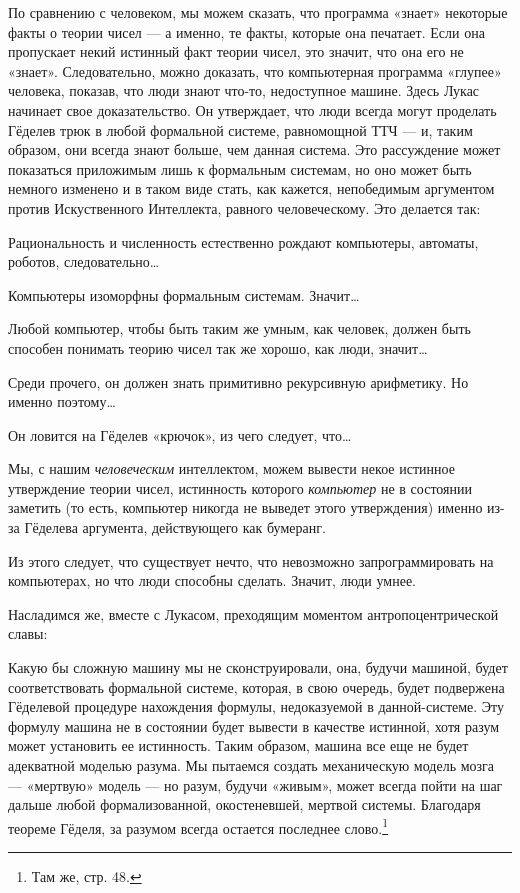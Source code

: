 По сравнению с человеком, мы можем сказать, что программа «знает» некоторые факты о теории чисел --- а именно, те факты, которые она печатает. Если она пропускает некий истинный факт теории чисел, это значит, что она его не «знает». Следовательно, можно доказать, что компьютерная программа «глупее» человека, показав, что люди знают что-то, недоступное машине. Здесь Лукас начинает свое доказательство. Он утверждает, что люди всегда могут проделать Гёделев трюк в любой формальной системе, равномощной ТТЧ --- и, таким образом, они всегда знают больше, чем данная система. Это рассуждение может показаться приложимым лишь к формальным системам, но оно может быть немного изменено и в таком виде стать, как кажется, непобедимым аргументом против Искуственного Интеллекта, равного человеческому. Это делается так:

Рациональность и численность естественно рождают компьютеры, автоматы, роботов, следовательно\ldots{}

Компьютеры изоморфны формальным системам. Значит\ldots{}

Любой компьютер, чтобы быть таким же умным, как человек, должен быть способен понимать теорию чисел так же хорошо, как люди, значит\ldots{}

Среди прочего, он должен знать примитивно рекурсивную арифметику. Но именно поэтому\ldots{}

Он ловится на Гёделев «крючок», из чего следует, что\ldots{}

Мы, с нашим \emph{человеческим} интеллектом, можем вывести некое истинное утверждение теории чисел, истинность которого \emph{компьютер} не в состоянии заметить (то есть, компьютер никогда не выведет этого утверждения) именно из-за Гёделева аргумента, действующего как бумеранг.

Из этого следует, что существует нечто, что невозможно запрограммировать на компьютерах, но что люди способны сделать. Значит, люди умнее.

Насладимся же, вместе с Лукасом, преходящим моментом антропоцентрической славы:

Какую бы сложную машину мы не сконструировали, она, будучи машиной, будет соответствовать формальной системе, которая, в свою очередь, будет подвержена Гёделевой процедуре нахождения формулы, недоказуемой в данной-системе. Эту формулу машина не в состоянии будет вывести в качестве истинной, хотя разум может установить ее истинность. Таким образом, машина все еще не будет адекватной моделью разума. Мы пытаемся создать механическую модель мозга --- «мертвую» модель --- но разум, будучи «живым», может всегда пойти на шаг дальше любой формализованной, окостеневшей, мертвой системы. Благодаря теореме Гёделя, за разумом всегда остается последнее слово.\footnote{Там же, стр. 48.}

